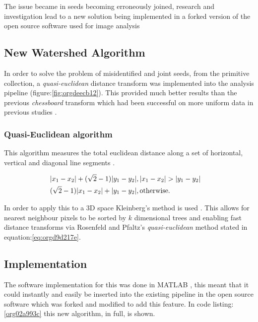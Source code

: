 \documentclass[11pt]{report}
\begin{document}
The issue became in seeds becoming erroneously joined, research and investigation lead to a new solution being implemented in a forked version of the open source software used for image analysis \cite{Hughes2017}

\subsection{New Watershed Algorithm}
\label{sec:orgc901612}

In order to solve the problem of misidentified and joint seeds, from the primitive collection,
a  \emph{quasi-euclidean} distance transform was implemented into the analysis pipeline (figure:\ref{fig:orgdeecb12}). This provided much better results than the previous
\emph{chessboard} transform which had been successful on more uniform data in previous studies \cite{Hughes2017}.

\subsubsection{Quasi-Euclidean algorithm}
\label{sec:org0364685}

This algorithm measures the total euclidean distance along a set of horizontal, vertical and diagonal
line segments \cite{Pfaltz1966}.

\begin{align}
\label{eq:orgd9d217e}
  &\begin{aligned}
&|x_1-x_2|+(\sqrt{2}-1)|y_1-y_2|, |x_1-x_2| > |y_1-y_2| \\
      &(\sqrt{2}-1)|x_1-x_2| + |y_1-y_2|, \textup{otherwise.}
  \end{aligned}
\end{align}

In order to apply this to a 3D space Kleinberg's method is used  \cite{Kleinberg1997}. This allows for nearest neighbour pixels to be sorted by \(k\) dimensional trees
and enabling fast distance transforms via Rosenfeld and Pfaltz's \emph{quasi-euclidean} method stated in equation:\ref{eq:orgd9d217e}.

\subsection{Implementation}
\label{sec:orgc18e9a3}

The software implementation for this was done in MATLAB \cite{MATHWORKS2017}, this meant that it could instantly and easily be inserted into the existing pipeline in the open source software which was forked and modified to add this feature. In code listing:\ref{org02a993c} this new algorithm, in full, is shown.
\end{document}
